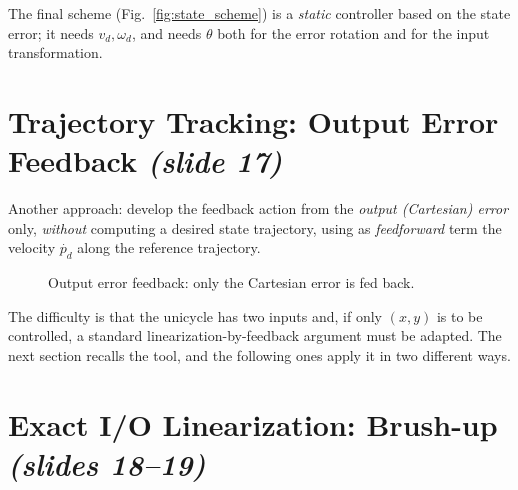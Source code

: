 \documentclass[11pt,a4paper]{article}
\def\bm#1{#1}%
\def\vect#1{#1}%
\newcommand{\vect}[1]{\bm{#1}}
\newcommand{\vd}{v_d}
\newcommand{\omd}{\omega_d}
\newcommand{\pd}{\vect{p}_d}
\theoremstyle{definition}
\theoremstyle{plain}
\theoremstyle{remark}
\begin{document}
The final scheme (Fig.~\ref{fig:state_scheme}) is a \emph{static} controller based on the state error; it needs $\vd,\omd$, and needs $\theta$ both for the error rotation and for the input transformation.

\section{Trajectory Tracking: Output Error Feedback \emph{(slide 17)}}

Another approach: develop the feedback action from the \emph{output (Cartesian) error} only, \emph{without} computing a desired state trajectory, using as \emph{feedforward} term the velocity $\dot{\pd}$ along the reference trajectory.

\begin{figure}[H]
\centering
{}
\caption{Output error feedback: only the Cartesian error is fed back.}
\end{figure}

The difficulty is that the unicycle has two inputs and, if only $(x,y)$ is to be controlled, a standard linearization-by-feedback argument must be adapted. The next section recalls the tool, and the following ones apply it in two different ways.

\section{Exact I/O Linearization: Brush-up \texorpdfstring{\emph{(slides 18--19)}}{(slides 18--19)}}
\end{document}
